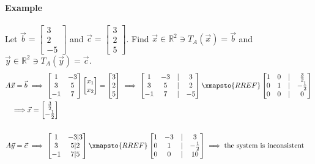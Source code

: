 \paragraph*{Example}
Let $\vec{b} = \begin{bmatrix}
    3 \\ 2 \\ -5
\end{bmatrix}$ and $\vec{c} = \begin{bmatrix}
    3 \\ 2 \\ 5
\end{bmatrix}$. Find $\vec{x} \in \mathbb{R}^2 \ni T_A(\vec{x}) = \vec{b}$ and $\vec{y} \in \mathbb{R}^2 \ni T_A(\vec{y}) = \vec{c}$.
\begin{align*}
    A\vec{x} = \vec{b} &\implies \begin{bmatrix}
        1 & -3 \\
        3 & 5 \\
        -1 & 7
    \end{bmatrix} \begin{bmatrix}
        x_1 \\
        x_2
    \end{bmatrix} = \begin{bmatrix}
        3 \\
        2 \\
        5
    \end{bmatrix} \implies \begin{bmatrix}
        1 & -3 & | & 3 \\
        3 & 5 & | & 2 \\
        -1 & 7 & | & -5
    \end{bmatrix} \xmapsto{RREF} \begin{bmatrix}
        1 & 0 & | & \frac{3}{2} \\
        0 & 1 & | & -\frac{1}{2} \\
        0 & 0 & | & 0
    \end{bmatrix} \\
    \implies & \vec{x} = \begin{bmatrix}
        \frac{3}{2} \\
        -\frac{1}{2}
    \end{bmatrix} \\
    \\
    A\vec{y} = \vec{c} &\implies \begin{bmatrix}
        1 & -3 | 3 \\
        3 & 5 | 2 \\
        -1 & 7 | 5
    \end{bmatrix} \xmapsto{RREF} \begin{bmatrix}
        1 & -3 & | & 3 \\
        0 & 1 & | & -\frac{1}{2} \\
        0 & 0 & | & 10
    \end{bmatrix} \implies \text{the system is inconsistent}
\end{align*}